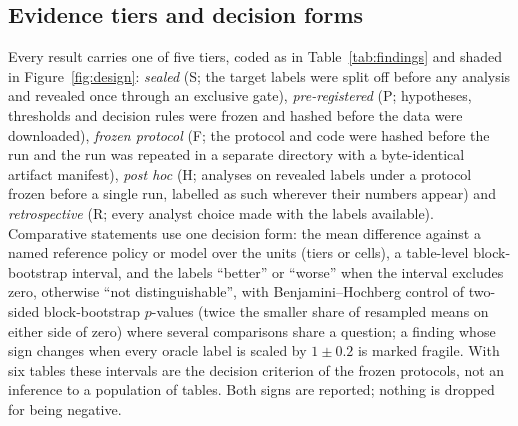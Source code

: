 \documentclass[11pt,a4paper]{article}
\begin{document}
\subsection{Evidence tiers and decision forms}
\label{sec:fw-evidence}
Every result carries one of five tiers, coded as in Table~\ref{tab:findings}
and shaded in Figure~\ref{fig:design}: \emph{sealed} (S; the target labels
were split off before any analysis and revealed once through an exclusive
gate), \emph{pre-registered} (P; hypotheses, thresholds and decision rules
were frozen and hashed before the data were downloaded), \emph{frozen
protocol} (F; the protocol and code were hashed before the run and the run was
repeated in a separate directory with a byte-identical artifact manifest),
\emph{post hoc} (H; analyses on revealed labels under a protocol frozen
before a single run, labelled as such wherever their numbers appear) and
\emph{retrospective} (R; every analyst choice made with the labels
available). Comparative statements use one decision form: the mean
difference against a named reference policy or model over the units (tiers or
cells), a table-level block-bootstrap interval, and the labels ``better'' or
``worse'' when the interval excludes zero, otherwise ``not distinguishable'',
with Benjamini--Hochberg control of two-sided block-bootstrap $p$-values
(twice the smaller share of resampled means on either side of zero) where
several comparisons share a question; a finding whose sign changes when every
oracle label is scaled by $1 \pm 0.2$ is marked fragile. With six tables these
intervals are the decision criterion of the frozen protocols, not an inference
to a population of tables. Both signs are reported; nothing is dropped for
being negative.
\end{document}
